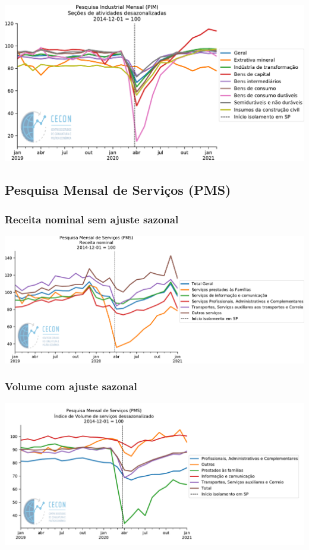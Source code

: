 \documentclass{SelfArx}
\begin{document}
\begin{center}
\includegraphics[width=.9\linewidth]{./figs/Setoriais/PIM_IBGE.pdf}
\end{center}


\subsection*{Pesquisa Mensal de Serviços (PMS)}
\label{sec:org314749e}
\subsubsection*{Receita nominal sem ajuste sazonal}
\label{sec:org797f0a9}
\begin{center}
\includegraphics[width=.9\linewidth]{./figs/Setoriais/PMS_IBGE.pdf}
\end{center}

\subsubsection*{Volume com ajuste sazonal}
\label{sec:orgbd8bcbe}


\begin{center}
\includegraphics[width=.9\linewidth]{./figs/Setoriais/PMS_vol_dessazonalizada.pdf}
\end{center}
\end{document}
